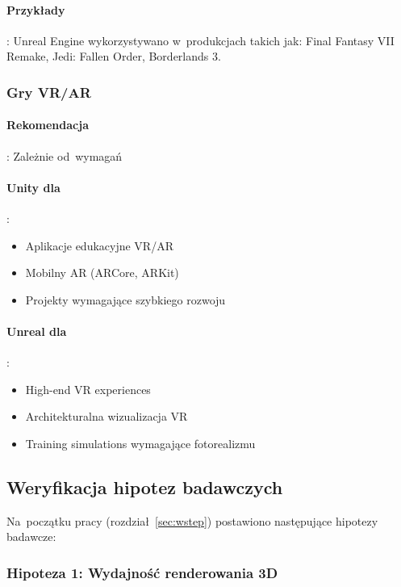 \paragraph{Przykłady}:
Unreal Engine wykorzystywano w~produkcjach takich jak: Final Fantasy VII Remake, Jedi: Fallen Order, Borderlands 3.

\subsubsection{Gry VR/AR}

\paragraph{Rekomendacja}: Zależnie od~wymagań

\paragraph{Unity dla}:
\begin{itemize}
    \item Aplikacje edukacyjne VR/AR
    \item Mobilny AR (ARCore, ARKit)
    \item Projekty wymagające szybkiego rozwoju
\end{itemize}

\paragraph{Unreal dla}:
\begin{itemize}
    \item High-end VR experiences
    \item Architekturalna wizualizacja VR
    \item Training simulations wymagające fotorealizmu
\end{itemize}

\subsection{Weryfikacja hipotez badawczych}

Na~początku pracy (rozdział~\ref{sec:wstep}) postawiono następujące hipotezy badawcze:

\subsubsection{Hipoteza 1: Wydajność renderowania 3D}

